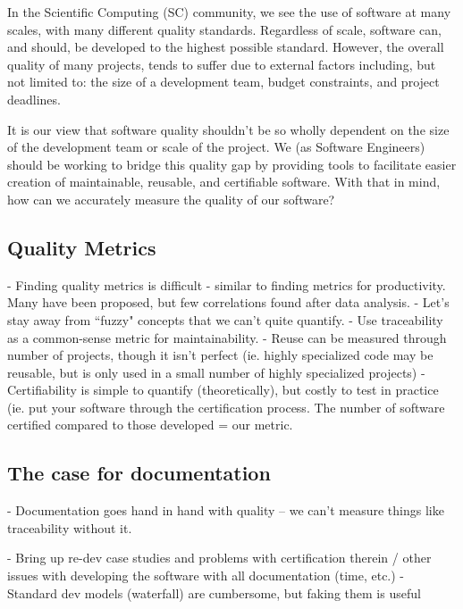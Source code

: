 \documentclass{llncs}
\begin{document}
In the Scientific Computing (SC) community, we see the use of software at many scales, with many different quality standards. Regardless of scale, software can, and should, be developed to the highest possible standard. However, the overall quality of many projects, tends to suffer due to external factors including, but not limited to: the size of a development team, budget constraints, and project deadlines.
  
It is our view that software quality shouldn't be so wholly dependent on the size of the development team or scale of the project. We (as Software Engineers) should be working to bridge this quality gap by providing tools to facilitate easier creation of maintainable, reusable, and certifiable software. With that in mind, how can we accurately measure the quality of our software?

\subsection{Quality Metrics}

- Finding quality metrics is difficult - similar to finding metrics for productivity. Many have been proposed, but few correlations found after data analysis.%
- Let's stay away from ``fuzzy" concepts that we can't quite quantify.
- Use traceability as a common-sense metric for maintainability.
- Reuse can be measured through number of projects, though it isn't perfect (ie. highly specialized code may be reusable, but is only used in a small number of highly specialized projects)
- Certifiability is simple to quantify (theoretically), but costly to test in practice (ie. put your software through the certification process. The number of software certified compared to those developed = our metric.%

\subsection{The case for documentation}

- Documentation goes hand in hand with quality -- we can't measure things like traceability without it. 

- Bring up re-dev case studies and problems with certification therein /
    other issues with developing the software with all documentation (time, etc.)
- Standard dev models (waterfall) are cumbersome, but faking them is useful \cite{}
\end{document}
